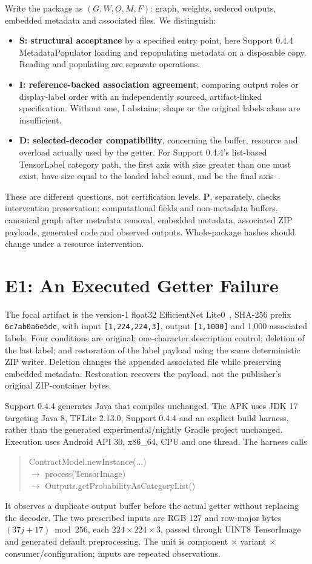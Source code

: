 \documentclass[10pt,conference]{IEEEtran}
\newcommand{\code}[1]{\texttt{#1}}
\begin{document}
Write the package as $(G,W,O,M,F)$: graph, weights, ordered outputs, embedded metadata and associated files. We distinguish:
\begin{itemize}
\item \textbf{S: structural acceptance} by a specified entry point, here Support 0.4.4 MetadataPopulator loading and repopulating metadata on a disposable copy. Reading and populating are separate operations.
\item \textbf{I: reference-backed association agreement}, comparing output roles or display-label order with an independently sourced, artifact-linked specification. Without one, I abstains; shape or the original labels alone are insufficient.
\item \textbf{D: selected-decoder compatibility}, concerning the buffer, resource and overload actually used by the getter. For Support 0.4.4's list-based TensorLabel category path, the first axis with size greater than one must exist, have size equal to the loaded label count, and be the final axis~\cite{tensorlabel}.
\end{itemize}
These are different questions, not certification levels. \textbf{P}, separately, checks intervention preservation: computational fields and non-metadata buffers, canonical graph after metadata removal, embedded metadata, associated ZIP payloads, generated code and observed outputs. Whole-package hashes should change under a resource intervention.

\section{E1: An Executed Getter Failure}
\label{sec:e1}
The focal artifact is the version-1 float32 EfficientNet Lite0~\cite{efficientnet}, SHA-256 prefix \code{6c7ab0a6e5dc}, with input \code{[1,224,224,3]}, output \code{[1,1000]} and 1,000 associated labels. Four conditions are original; one-character description control; deletion of the last label; and restoration of the label payload using the same deterministic ZIP writer. Deletion changes the appended associated file while preserving embedded metadata. Restoration recovers the payload, not the publisher's original ZIP-container bytes.

Support 0.4.4 generates Java that compiles unchanged. The APK uses JDK 17 targeting Java 8, TFLite 2.13.0, Support 0.4.4 and an explicit build harness, rather than the generated experimental/nightly Gradle project unchanged. Execution uses Android API 30, x86\_64, CPU and one thread. The harness calls
\begin{quote}\small\ttfamily\raggedright
ContractModel.newInstance(...)\\
\(\rightarrow\) process(TensorImage)\\
\(\rightarrow\) Outputs.getProbabilityAsCategoryList()
\end{quote}
It observes a duplicate output buffer before the actual getter without replacing the decoder. The two prescribed inputs are RGB 127 and row-major bytes $(37j+17)\bmod256$, each $224\times224\times3$, passed through UINT8 TensorImage and generated default preprocessing. The unit is component $\times$ variant $\times$ consumer/configuration; inputs are repeated observations.
\end{document}
